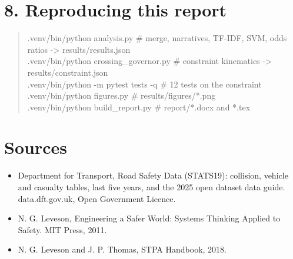 \documentclass[10pt,a4paper]{article}
\begin{document}
\section*{8. Reproducing this report}

\begin{quote}\small\ttfamily\raggedright .venv/bin/python analysis.py            \# merge, narratives, TF-IDF, SVM, odds ratios -> results/results.json\\ .venv/bin/python crossing\_governor.py   \# constraint kinematics -> results/constraint.json\\ .venv/bin/python -m pytest tests -q     \# 12 tests on the constraint\\ .venv/bin/python figures.py             \# results/figures/*.png\\ .venv/bin/python build\_report.py        \# report/*.docx and *.tex\end{quote}

\section*{Sources}

\begin{itemize}\item Department for Transport, Road Safety Data (STATS19): collision, vehicle and casualty tables, last five years, and the 2025 open dataset data guide. data.dft.gov.uk, Open Government Licence.
\item N. G. Leveson, Engineering a Safer World: Systems Thinking Applied to Safety. MIT Press, 2011.
\item N. G. Leveson and J. P. Thomas, STPA Handbook, 2018.
\end{itemize}
\end{document}

